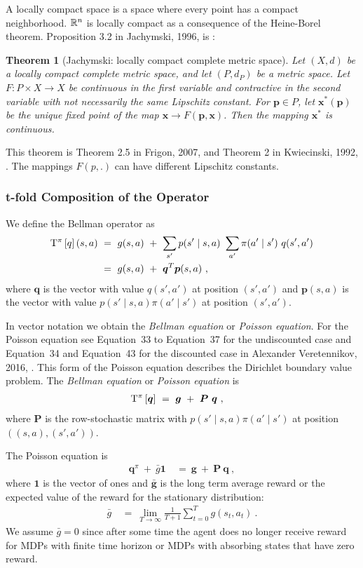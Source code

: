 \documentclass{article}
\newtheorem{theoremA}{Theorem}
\newcommand\Bg{\bm{g}}
\newcommand\Bp{\bm{p}}
\newcommand\Bq{\bm{q}}
\newcommand\Bx{\bm{x}}
\newcommand\BP{\bm{P}}
\newcommand\BOn{\bm{1}}
\begin{document}
\begin{appendices}
A locally compact space is a space where  every point has a compact neighborhood.
$\mathbb{R}^n$ is locally compact as a consequence of the Heine-Borel theorem.
Proposition 3.2 in Jachymski, 1996, is \cite{Jachymski:96}:
\begin{theoremA}[Jachymski: locally compact complete metric space]
Let $(X, d)$ be a locally compact complete metric space,
and let $(P, d_P)$ be a
metric space. Let $F: P \times X \to X$
be continuous in the first variable and
contractive in the second variable with not necessarily the
same Lipschitz constant.
For $\Bp \in P$, let $\Bx^*(\Bp)$
be the unique fixed point of the map $\Bx \to F(\Bp, \Bx)$. Then the
mapping $\Bx^*$ is continuous.
\end{theoremA}
This theorem is Theorem 2.5 in Frigon, 2007,  \cite{Frigon:07}
and Theorem 2 in Kwiecinski, 1992, \cite{Kwiecinski:92}.
The mappings $F(p,.)$ can have different Lipschitz constants.

\subsubsection{t-fold Composition of the Operator}
\label{sec:At-fold}

We define the Bellman operator as
\begin{align}
  \rT^\pi \left[ q \right] (s,a)   \ &= \ g(s,a)
  \ + \  \sum_{s'} p(s'\mid s,a) \ \sum_{a'}
  \pi(a' \mid s') \ q(s',a')  \\ \nonumber
  &= \  g(s,a) \ + \ \Bq^T  \Bp(s,a) \ ,
\end{align}
where $\Bq$ is the vector with value $q(s',a')$ at position $(s',a')$
and $\Bp(s,a)$ is the vector with value
$p(s'\mid s,a)\pi(a' \mid s')$ at position $(s',a')$.

In vector notation we obtain
the {\em Bellman equation} or {\em Poisson equation}.
For the Poisson equation see
Equation~33 to Equation~37 for the undiscounted case and Equation~34 and Equation~43 for the
discounted case in Alexander Veretennikov, 2016,
\cite{Veretennikov:16}.
This form of the Poisson equation describes the Dirichlet boundary
value problem.
The {\em Bellman equation} or {\em Poisson equation} is
\begin{align}
  \rT^\pi \left[ \Bq \right]    \ &= \ \Bg
  \ + \  \BP \ \Bq  \ ,
\end{align}
where $\BP$ is the row-stochastic matrix with
$p(s'\mid s,a)\pi(a' \mid s')$ at position $((s,a),(s',a'))$.


The Poisson equation is
\begin{align}
\label{eq:poisson1}
 \Bq^\pi \ + \ \bar{g} \BOn \ &= \  \Bg \ + \  \BP \ \Bq  \ ,
\end{align} 
where $\BOn$ is the vector of ones and
$\bar{\Bg}$ is the long term average reward or the expected 
value of the reward for the stationary distribution:
\begin{align}
 \bar{g} \ &= \  \lim_{T\to \infty} \frac{1}{T+1} \sum_{t=0}^T g(s_t,a_t) \ .
\end{align} 
We assume $\bar{g}=0$ since after some time the agent does no longer
receive reward for MDPs with finite time horizon or MDPs with
absorbing states that have zero reward.





\end{appendices}
\end{document}
